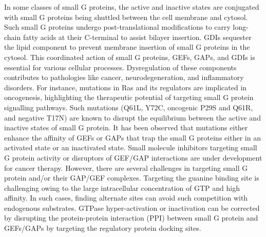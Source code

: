 \documentclass[12pt, a4paper]{achemso}
\begin{document}
In some classes of small G proteins, the active and inactive states are conjugated with small G proteins being shuttled between the cell membrane and cytosol. Such small G proteins undergo post-translational modifications to carry long-chain fatty acids at their C-terminal to assist bilayer insertion. GDIs\cite{dermardirossian2005gdis, maruta1998gtpase} sequester the lipid component to prevent membrane insertion of small G proteins in the cytosol. This coordinated action of small G proteins, GEFs, GAPs, and GDIs is essential for various cellular processes. Dysregulation of these components contributes to pathologies like cancer, neurodegeneration, and inflammatory disorders. For instance, mutations in Ras and its regulators are implicated in oncogenesis, highlighting the therapeutic potential of targeting small G protein signalling pathways\cite{cherfils2013regulation}. Such mutations (Q61L, Y72C, oncogenic P29S and Q61R, and negative T17N) are known to disrupt the equilibrium between the active and inactive states of small G protein\cite{rac1muts}. It has been observed that mutations either enhance the affinity of GEFs or GAPs that trap the small G proteins either in an activated state or an inactivated state. Small molecule inhibitors targeting small G protein activity or disruptors of GEF/GAP interactions\cite{gray2020targeting} are under development for cancer therapy. However, there are several challenges in targeting small G protein and/or their GAP/GEF complexes. Targeting the guanine binding site is challenging owing to the large intracellular concentration of GTP and high affinity\cite{traut1994physiological}. In such cases, finding alternate sites can avoid such competition with endogenous substrates. GTPase hyper-activation or inactivation can be corrected by disrupting the protein-protein interaction (PPI) between small G protein and GEFs/GAPs by targeting the regulatory protein docking sites.   
\end{document}
